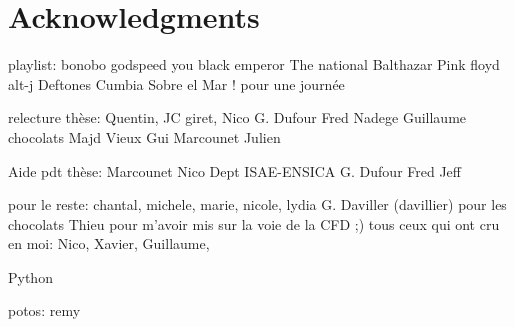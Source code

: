 
\chapter*{Acknowledgments}
\thispagestyle{empty}

playlist:
bonobo
godspeed you black emperor
The national
Balthazar
Pink floyd
alt-j
Deftones
Cumbia Sobre el Mar ! pour une journée

relecture thèse:
Quentin,
JC giret,
Nico
G. Dufour
Fred
Nadege
Guillaume chocolats
Majd
Vieux Gui
Marcounet
Julien

Aide pdt thèse:
Marcounet
Nico
Dept ISAE-ENSICA
G. Dufour
Fred
Jeff

pour le reste:
chantal, michele, marie, nicole, lydia
G. Daviller (davillier) pour les chocolats
Thieu pour m'avoir mis sur la voie de la CFD ;)
tous ceux qui ont cru en moi: Nico, Xavier, Guillaume, 

Python 

potos:
remy